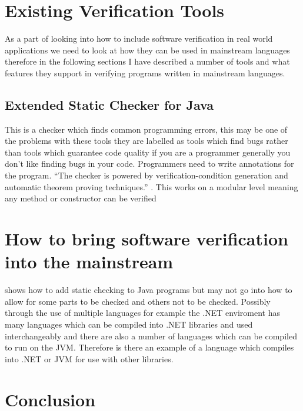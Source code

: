 \documentclass[a4paper,12pt]{scrartcl}
\begin{document}
	\section{Existing Verification Tools}
	{
		As a part of looking into how to include software verification in real world applications we need to look at how they can be used in mainstream languages therefore in the following sections I have described a number of tools and what features they support in verifying programs written in mainstream languages.
		\subsection{Extended Static Checker for Java\cite{Flanagan2002}}
		{
			This is a checker which finds common programming errors, this may be one of the problems with these tools they are labelled as tools which find bugs rather than tools which guarantee code quality if you are a programmer generally you don't like finding bugs in your code. Programmers need to write annotations for the program. \enquote{The checker is powered by verification-condition generation and automatic theorem proving techniques.}\cite{Flanagan2002} . This works  on a modular level meaning any method or constructor can be verified
		}
	}

	\section{How to bring software verification into the mainstream}
	{
		\cite{Flanagan2002} shows how to add static checking to Java programs but may not go into how to allow for some parts to be checked and others not to be checked. Possibly through the use of multiple languages for example the .NET enviroment has many languages which can be compiled into .NET libraries and used interchangeably and there are also a number of languages which can be compiled to run on the JVM. Therefore is there an example of a language which compiles into .NET or JVM for use with other libraries.
	}
	
	\section{Conclusion}
	{
	
	}
	
	\newpage
	
	\printbibliography[heading=bibintoc,title=References]
\end{document}
